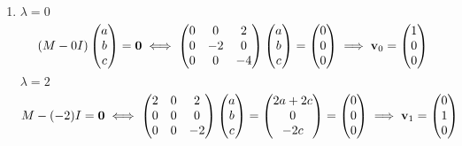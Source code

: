 \documentclass[10pt, a4paper]{article}
\begin{document}
\begin{problem}
\begin{solution}
\begin{enumerate}[label = (\alph*)]
            \item
            $\lambda = 0$
            \[
            (M - 0I)\begin{pmatrix}
                a \\ b \\ c
            \end{pmatrix} = \mathbf{0} \iff \begin{pmatrix}
                0 & 0 & 2 \\
                0 & -2 & 0 \\
                0 & 0 & -4
            \end{pmatrix}\begin{pmatrix}
                a \\ b \\ c
            \end{pmatrix} = \begin{pmatrix}
                0 \\ 0 \\ 0
            \end{pmatrix} \implies \mathbf{v}_0 = \begin{pmatrix}
                1 \\ 0 \\ 0
            \end{pmatrix}
            \]
            $\lambda = 2$
            \[
            M - (-2)I = \mathbf{0} \iff \begin{pmatrix}
                2 & 0 & 2 \\ 0 & 0 & 0 \\ 0 & 0 & -2
            \end{pmatrix}\begin{pmatrix}
                a \\ b \\ c
            \end{pmatrix} = \begin{pmatrix}
                2a + 2c \\ 0 \\ -2c
            \end{pmatrix} = \begin{pmatrix}
                0 \\ 0 \\ 0
            \end{pmatrix} \implies \mathbf{v}_1 = \begin{pmatrix}
                0 \\ 1 \\ 0
            \end{pmatrix}
\]
\end{enumerate}
\end{solution}
\end{problem}
\end{document}
